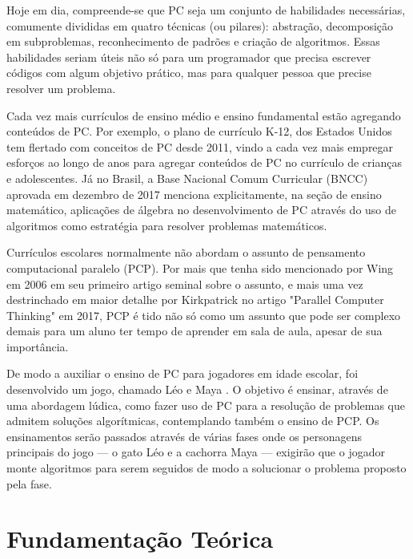 \documentclass[conference]{IEEEtran}
\newcommand{\xexeo}[1]{\ednote{\textcolor{red}{Xexéo - #1}}}
\begin{document}
Hoje em dia, compreende-se que PC seja um conjunto de habilidades necessárias, comumente divididas em quatro técnicas (ou pilares): abstração, decomposição em subproblemas, reconhecimento de padrões e criação de algoritmos\cite{b3}. Essas habilidades seriam úteis não só para um programador que precisa escrever códigos com algum objetivo prático, mas para qualquer pessoa que precise resolver um problema.

Cada vez mais currículos de ensino médio e ensino fundamental estão agregando conteúdos de PC. Por exemplo, o plano de currículo K-12, dos Estados Unidos tem flertado com conceitos de PC desde 2011\cite{b1}, vindo a cada vez mais empregar esforços ao longo de anos para agregar conteúdos de PC no currículo de crianças e adolescentes. Já no Brasil, a Base Nacional Comum Curricular (BNCC) aprovada em dezembro de 2017 menciona explicitamente, na seção de ensino matemático, aplicações de álgebra no desenvolvimento de PC através do uso de algoritmos como estratégia para resolver problemas matemáticos\cite{b4}.

Currículos escolares normalmente não abordam o assunto de pensamento computacional paralelo (PCP). Por mais que tenha sido mencionado por Wing em 2006 em seu primeiro artigo seminal sobre o assunto, e mais uma vez destrinchado em maior detalhe por Kirkpatrick no artigo "Parallel Computer Thinking" em 2017, PCP é tido não só como um assunto que pode ser complexo demais para um aluno ter tempo de aprender em sala de aula, apesar de sua importância\cite{b5}\xexeo{Não só? Falto o como ...}. 

De modo a auxiliar o ensino de PC para jogadores em idade escolar,  foi desenvolvido um jogo, chamado Léo e Maya \xexeo{- isso não pode aparecer - e nem se fala isso - os alunos Horácio Macêdo e Júlio Rama do curso de Bacharelado de Ciência da Computação desenvolveram o jogo educativo endógeno Léo \& Maya}.  O objetivo é ensinar, através de uma abordagem lúdica, como fazer uso de PC para a resolução de problemas que admitem soluções algorítmicas, contemplando também o ensino de PCP. Os ensinamentos serão passados através de várias fases onde os personagens principais do jogo — o gato Léo e a cachorra Maya — exigirão que o jogador monte algoritmos para serem seguidos de modo a solucionar o problema proposto pela fase\xexeo{Os personagens não exige, reconstruir com algo como ``onde os jogadores devem montar algoritmos para serem seguidos por dois personagens, ...}.

\section{Fundamentação Teórica}
\end{document}

